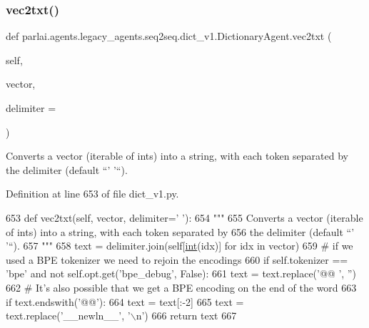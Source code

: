 \subsubsection{\texorpdfstring{vec2txt()}{vec2txt()}}
{\footnotesize\ttfamily def parlai.\+agents.\+legacy\+\_\+agents.\+seq2seq.\+dict\+\_\+v1.\+Dictionary\+Agent.\+vec2txt (\begin{DoxyParamCaption}\item[{}]{self,  }\item[{}]{vector,  }\item[{}]{delimiter = {\ttfamily \textquotesingle{}~\textquotesingle{}} }\end{DoxyParamCaption})}

\begin{DoxyVerb}Converts a vector (iterable of ints) into a string, with each token separated by
the delimiter (default ``' '``).
\end{DoxyVerb}
 

Definition at line 653 of file dict\+\_\+v1.\+py.


\begin{DoxyCode}
653     \textcolor{keyword}{def }vec2txt(self, vector, delimiter=' '):
654         \textcolor{stringliteral}{"""}
655 \textcolor{stringliteral}{        Converts a vector (iterable of ints) into a string, with each token separated by}
656 \textcolor{stringliteral}{        the delimiter (default ``' '``).}
657 \textcolor{stringliteral}{        """}
658         text = delimiter.join(self[\hyperlink{namespacelanguage__model_1_1eval__ppl_a7d12ee00479673c5c8d1f6d01faa272a}{int}(idx)] \textcolor{keywordflow}{for} idx \textcolor{keywordflow}{in} vector)
659         \textcolor{comment}{# if we used a BPE tokenizer we need to rejoin the encodings}
660         \textcolor{keywordflow}{if} self.tokenizer == \textcolor{stringliteral}{'bpe'} \textcolor{keywordflow}{and} \textcolor{keywordflow}{not} self.opt.get(\textcolor{stringliteral}{'bpe\_debug'}, \textcolor{keyword}{False}):
661             text = text.replace(\textcolor{stringliteral}{'@@ '}, \textcolor{stringliteral}{''})
662             \textcolor{comment}{# It's also possible that we get a BPE encoding on the end of the word}
663             \textcolor{keywordflow}{if} text.endswith(\textcolor{stringliteral}{'@@'}):
664                 text = text[:-2]
665             text = text.replace(\textcolor{stringliteral}{'\_\_newln\_\_'}, \textcolor{stringliteral}{'\(\backslash\)n'})
666         \textcolor{keywordflow}{return} text
667 
\end{DoxyCode}


